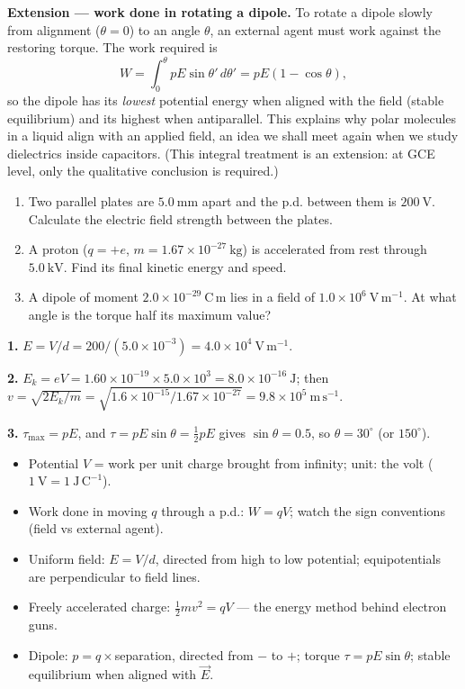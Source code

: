 \documentclass[11pt]{article}
\begin{document}
\textbf{Extension — work done in rotating a dipole.} To rotate a dipole slowly from alignment ($\theta = 0$) to an angle $\theta$, an external agent must work against the restoring torque. The work required is
\[
W = \int_0^{\theta} pE\sin\theta'\,d\theta' = pE(1 - \cos\theta),
\]
so the dipole has its \emph{lowest} potential energy when aligned with the field (stable equilibrium) and its highest when antiparallel. This explains why polar molecules in a liquid align with an applied field, an idea we shall meet again when we study dielectrics inside capacitors. (This integral treatment is an extension: at GCE level, only the qualitative conclusion is required.)

\begin{exercice}[Practice]
\begin{enumerate}
\item Two parallel plates are $5.0\ \mathrm{mm}$ apart and the p.d. between them is $200\ \mathrm{V}$. Calculate the electric field strength between the plates.
\item A proton ($q = +e$, $m = 1.67\times 10^{-27}\ \mathrm{kg}$) is accelerated from rest through $5.0\ \mathrm{kV}$. Find its final kinetic energy and speed.
\item A dipole of moment $2.0\times 10^{-29}\ \mathrm{C\,m}$ lies in a field of $1.0\times 10^{6}\ \mathrm{V\,m^{-1}}$. At what angle is the torque half its maximum value?
\end{enumerate}
\end{exercice}

\begin{corrige}[Exercise 1]
\textbf{1.} $E = V/d = 200/(5.0\times 10^{-3}) = 4.0\times 10^{4}\ \mathrm{V\,m^{-1}}$.

\textbf{2.} $E_k = eV = 1.60\times 10^{-19}\times 5.0\times 10^{3} = 8.0\times 10^{-16}\ \mathrm{J}$; then $v = \sqrt{2E_k/m} = \sqrt{1.6\times 10^{-15}/1.67\times 10^{-27}} = 9.8\times 10^{5}\ \mathrm{m\,s^{-1}}$.

\textbf{3.} $\tau_{\max} = pE$, and $\tau = pE\sin\theta = \tfrac{1}{2}pE$ gives $\sin\theta = 0.5$, so $\theta = 30^{\circ}$ (or $150^{\circ}$).
\end{corrige}

\begin{aretenir}
\begin{itemize}
\item Potential $V$ = work per unit charge brought from infinity; unit: the volt ($1\ \mathrm{V} = 1\ \mathrm{J\,C^{-1}}$).
\item Work done in moving $q$ through a p.d.: $W = qV$; watch the sign conventions (field vs external agent).
\item Uniform field: $E = V/d$, directed from high to low potential; equipotentials are perpendicular to field lines.
\item Freely accelerated charge: $\tfrac{1}{2}mv^2 = qV$ — the energy method behind electron guns.
\item Dipole: $p = q\times$separation, directed from $-$ to $+$; torque $\tau = pE\sin\theta$; stable equilibrium when aligned with $\vec{E}$.
\end{itemize}
\end{aretenir}
\end{document}
